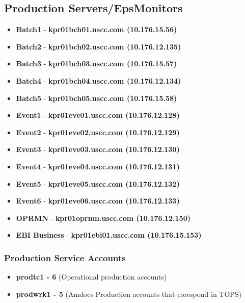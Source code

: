 \documentclass[12pt,twoside]{article}
\begin{document}
\subsection{Production Servers/EpsMonitors}
\label{sec:orgheadline12}
\footnotesize
\begin{itemize}
\item \textbf{Batch1} - \textbf{kpr01bch01.uscc.com (10.176.15.56)}
\item \textbf{Batch2} - \textbf{kpr01bch02.uscc.com (10.176.12.135)}
\item \textbf{Batch3} - \textbf{kpr01bch03.uscc.com (10.176.15.57)}
\item \textbf{Batch4} - \textbf{kpr01bch04.uscc.com (10.176.12.134)}
\item \textbf{Batch5} - \textbf{kpr01bch05.uscc.com (10.176.15.58)}
\item \textbf{Event1} - \textbf{kpr01eve01.uscc.com (10.176.12.128)}
\item \textbf{Event2} - \textbf{kpr01eve02.uscc.com (10.176.12.129)}
\item \textbf{Event3} - \textbf{kpr01eve03.uscc.com (10.176.12.130)}
\item \textbf{Event4} - \textbf{kpr01eve04.uscc.com (10.176.12.131)}
\item \textbf{Event5} - \textbf{kpr01eve05.uscc.com (10.176.12.132)}
\item \textbf{Event6} - \textbf{kpr01eve06.uscc.com (10.176.12.133)}
\item \textbf{OPRMN}  - \textbf{kpr01oprmn.uscc.com (10.176.12.150)}
\item \textbf{EBI Business} - \textbf{kpr01ebi01.uscc.com (10.176.15.153)}
\end{itemize}

\normalsize
\subsubsection{Production Service Accounts}
\label{sec:orgheadline9}
\begin{itemize}
\item \textbf{prodtc1 - 6} (Operational production accounts)
\item \textbf{prodwrk1 - 5} (Amdocs Production accounts that corespond in TOPS)
\end{itemize}
\end{document}
